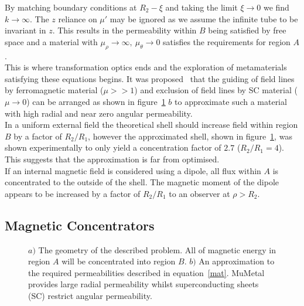 \documentclass[11pt]{iopart}
\begin{document}
By matching boundary conditions at $R_2-\xi$ and taking the limit
$\xi\rightarrow 0$ we find $k \rightarrow \infty$. The $z$ reliance on
$\mu'$ may be ignored as we assume the infinite tube to be invariant
in $z$.  This results in the permeability within $B$ being satisfied
by free space and a material with $\mu_{\rho} \rightarrow \infty,~
\mu_{\theta} \rightarrow 0$ satisfies the requirements for region $A$.\\
This is where transformation optics ends and the exploration of
metamaterials satisfying these equations begins. It was proposed~\cite{Navau2012}
that the guiding of field lines by ferromagnetic material ($\mu >> 1$)
and exclusion of field lines by SC material ($\mu \rightarrow 0$) can
be arranged as shown in figure~\ref{conc} $b$ to approximate such a material with
high radial and near zero angular permeability.\\ In a uniform
external field the theoretical shell should increase field within
region $B$ by a factor of $R_2/R_1$, however the approximated shell,
shown in figure~\ref{conc}, was shown experimentally to only yield a
concentration factor of $2.7$ ($R_2/R_1=4$). This suggests that the
approximation is far from optimised. \\ If an internal magnetic field
is considered using a dipole, all flux within $A$ is concentrated to
the outside of the shell. The magnetic moment of the dipole appears to
be increased by a factor of $R_2/R_1$ to an observer at $\rho>R_2$.
\subsection*{Magnetic Concentrators}
\begin{figure}[!tb] \centering
  \caption{\label{conc} $a)$ The geometry of the described problem. All of magnetic energy in region $A$ will be concentrated into region $B$. $b)$ An approximation to the required permeabilities described in equation~\ref{mat}. MuMetal provides large radial permeability whilst superconducting sheets (SC) restrict angular permeability.}
\end{figure}
\end{document}
